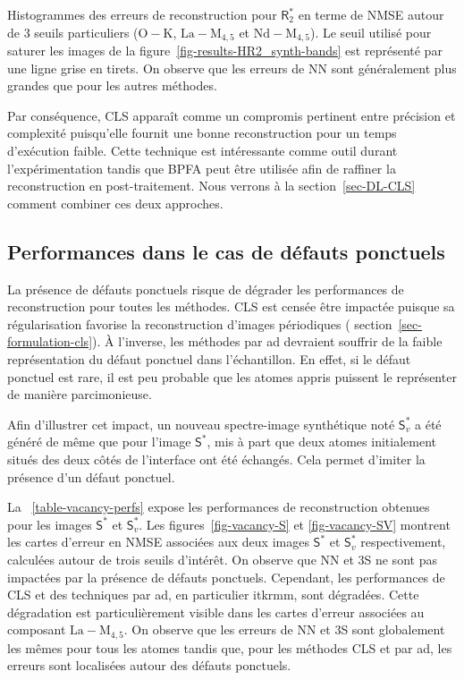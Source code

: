 \begin{normalfigure*}
    \caption{Histogrammes des erreurs de reconstruction pour $\mathsf{R}_2^*$ en terme de NMSE autour de 3 seuils particuliers ($\mathrm{O-K}$, $\mathrm{La-M}_{4, 5}$ et $\mathrm{Nd-M}_{4, 5}$). Le seuil utilisé pour saturer les images de la figure~\protect\ref{fig-results-HR2_synth-bands} est représenté par une ligne grise en tirets. On observe que les erreurs de NN sont généralement plus grandes que pour les autres méthodes.
        \protect\label{fig-qu1-21-histograms}}    
\end{normalfigure*}


Par conséquence, CLS apparaît comme un compromis pertinent entre précision et complexité puisqu'elle fournit une bonne reconstruction pour un temps d'exécution faible. Cette technique est intéressante comme outil durant l'expérimentation tandis que BPFA peut être utilisée afin de raffiner la reconstruction en post-traitement. Nous verrons à la section~\ref{sec-DL-CLS} comment combiner ces deux approches.



\subsection{Performances dans le cas de défauts ponctuels}

La présence de défauts ponctuels risque de dégrader les performances de reconstruction pour toutes les méthodes. CLS est censée être impactée puisque sa régularisation favorise la reconstruction d'images périodiques (\cf{} section~\ref{sec-formulation-cls}). \`A l'inverse, les méthodes par \gls{ad} devraient souffrir de la faible  représentation du défaut ponctuel dans l'échantillon. En effet, si le défaut ponctuel est rare, il est peu probable que les atomes appris puissent le représenter de manière parcimonieuse.

Afin d'illustrer cet impact, un nouveau spectre-image synthétique noté $\mathsf{S}_v^*$ a été généré de même que pour l'image $\mathsf{S}^*$, mis à part que deux atomes initialement situés des deux côtés de l'interface ont été échangés. Cela permet d'imiter la présence d'un défaut ponctuel.

La \tabname~\ref{table-vacancy-perfs} expose les performances de reconstruction obtenues pour les images $\mathsf{S}^*$ et $\mathsf{S}_v^*$. Les figures~\ref{fig-vacancy-S} et \ref{fig-vacancy-SV} montrent les cartes d'erreur en NMSE associées aux deux images $\mathsf{S}^*$ et $\mathsf{S}_v^*$ respectivement, calculées autour de trois seuils d'intérêt. On observe que NN et 3S ne sont pas impactées par la présence de défauts ponctuels. Cependant, les performances de CLS et des techniques par \gls{ad}, en particulier \gls{itkrmm}, sont dégradées. Cette dégradation est particulièrement visible dans les cartes d'erreur associées au composant $\mathrm{La-M}_{4, 5}$. On observe que les erreurs de NN et 3S sont globalement les mêmes  pour tous les atomes tandis que, pour les méthodes CLS et par \gls{ad}, les erreurs sont localisées autour des défauts ponctuels.

